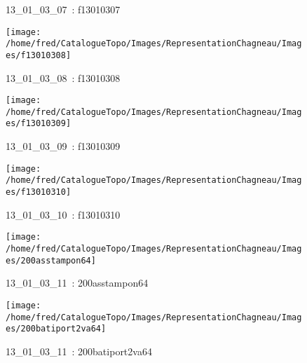 \documentclass[12pt,titlepage]{book}
\begin{document}
\begin{figure}[h!]
\begin{minipage}[t]{3cm}
\begin{center}
      \caption[~13\_01\_03\_07]{\small{13\_01\_03\_07~:} \tiny{f13010307}}\label{f13010307}
    \end{center}
  \end{minipage}
  \begin{minipage}[t]{3cm}
    \begin{center}
      \texttt{[image: /home/fred/CatalogueTopo/Images/RepresentationChagneau/Images/f13010308]}
      \caption[~13\_01\_03\_08]{\small{13\_01\_03\_08~:} \tiny{f13010308}}\label{f13010308}
    \end{center}
  \end{minipage}
  \begin{minipage}[t]{3cm}
    \begin{center}
      \texttt{[image: /home/fred/CatalogueTopo/Images/RepresentationChagneau/Images/f13010309]}
      \caption[~13\_01\_03\_09]{\small{13\_01\_03\_09~:} \tiny{f13010309}}\label{f13010309}
    \end{center}
  \end{minipage}
  \begin{minipage}[t]{3cm}
    \begin{center}
      \texttt{[image: /home/fred/CatalogueTopo/Images/RepresentationChagneau/Images/f13010310]}
      \caption[~13\_01\_03\_10]{\small{13\_01\_03\_10~:} \tiny{f13010310}}\label{f13010310}
    \end{center}
  \end{minipage}
  \begin{minipage}[t]{3cm}
    \begin{center}
      \texttt{[image: /home/fred/CatalogueTopo/Images/RepresentationChagneau/Images/200asstampon64]}
      \caption[~13\_01\_03\_11]{\small{13\_01\_03\_11~:} \tiny{200asstampon64}}\label{200asstampon64}
    \end{center}
  \end{minipage}
  \begin{minipage}[t]{3cm}
    \begin{center}
      \texttt{[image: /home/fred/CatalogueTopo/Images/RepresentationChagneau/Images/200batiport2va64]}
      \caption[~13\_01\_03\_11]{\small{13\_01\_03\_11~:} \tiny{200batiport2va64}}\label{200batiport2va64}
    \end{center}

\end{minipage}
\end{figure}
\end{document}
